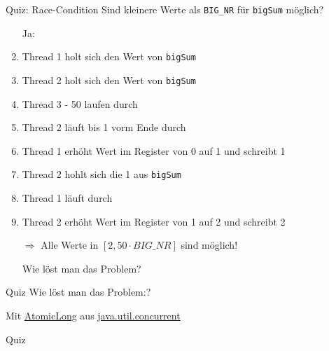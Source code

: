 \documentclass[usepdftitle=false,hyperref={pdfpagelabels=false}]{beamer}
\begin{document}
\begin{frame}{Quiz: Race-Condition}
    Sind kleinere Werte als \texttt{BIG\_NR} für \texttt{bigSum} möglich?
    \begin{enumerate}[<+->]
        \item[] Ja:
        \item Thread 1 holt sich den Wert von \texttt{bigSum}
        \item Thread 2 holt sich den Wert von \texttt{bigSum}
        \item Thread 3 - 50 laufen durch
        \item Thread 2 läuft bis 1 vorm Ende durch
        \item Thread 1 erhöht Wert im Register von 0 auf 1 und schreibt 1
        \item Thread 2 hohlt sich die 1 aus \texttt{bigSum}
        \item Thread 1 läuft durch
        \item Thread 2 erhöht Wert im Register von 1 auf 2 und schreibt 2
        \item[$\Rightarrow$] Alle Werte in $[2, 50 \cdot BIG\_NR]$ sind möglich!
        \item[] Wie löst man das Problem?
    \end{enumerate}
\end{frame}

\begin{frame}{Quiz}
    Wie löst man das Problem:?
    
    Mit
    \href{http://docs.oracle.com/javase/7/docs/api/java/util/concurrent/atomic/AtomicLong.html}{AtomicLong}
    aus 
    \href{http://docs.oracle.com/javase/7/docs/api/java/util/concurrent/package-summary.html}{java.util.concurrent}
\end{frame}

\begin{frame}{Quiz}
    \begin{minipage}[b]{0.45\linewidth}
        \inputminted[linenos=true, numbersep=5pt, tabsize=4, fontsize=\tiny]{java}{AnswerMain.java}
    \end{minipage}
    \hspace{0.5cm}
    \begin{minipage}[b]{0.45\linewidth}
        \inputminted[linenos=true, numbersep=5pt, tabsize=4, fontsize=\tiny]{java}{AnswerSum.java}
        \vspace{3.5cm}
    \end{minipage}
\end{frame}
\end{document}
